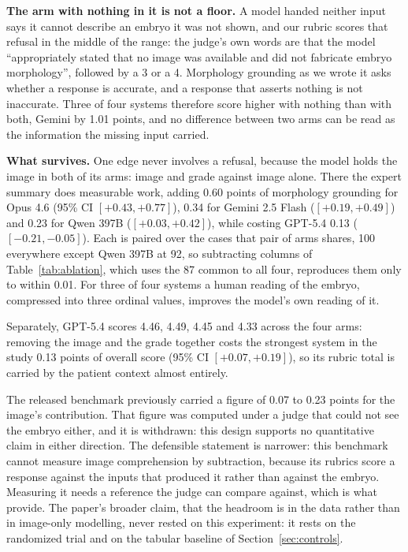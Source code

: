 \documentclass[11pt]{article}
\begin{document}
\textbf{The arm with nothing in it is not a floor.} A model handed neither input
says it cannot describe an embryo it was not shown, and our rubric scores that
refusal in the middle of the range: the judge's own words are that the model
``appropriately stated that no image was available and did not fabricate embryo
morphology'', followed by a 3 or a 4. Morphology grounding as we wrote it asks
whether a response is accurate, and a response that asserts nothing is not
inaccurate. Three of four systems therefore score higher with nothing than with
both, Gemini by 1.01 points, and no difference between two arms can be read as
the information the missing input carried.

\textbf{What survives.} One edge never involves a refusal, because the model
holds the image in both of its arms: image and grade against image alone. There
the expert summary does measurable work, adding 0.60 points of morphology
grounding for Opus 4.6 (95\% CI $[+0.43, +0.77]$), 0.34 for Gemini 2.5 Flash
($[+0.19, +0.49]$) and 0.23 for Qwen 397B ($[+0.03, +0.42]$), while costing
GPT-5.4 0.13 ($[-0.21, -0.05]$). Each is paired over the cases that pair of arms
shares, 100 everywhere except Qwen 397B at 92, so subtracting columns of
Table~\ref{tab:ablation}, which uses the 87 common to all four, reproduces them
only to within 0.01. For three of four systems a human reading of the embryo,
compressed into three ordinal values, improves the model's own reading of it.

Separately, GPT-5.4 scores 4.46, 4.49, 4.45 and 4.33 across the four arms:
removing the image and the grade together costs the strongest system in the study
0.13 points of overall score (95\% CI $[+0.07, +0.19]$), so its rubric total is
carried by the patient context almost entirely.

The released benchmark previously carried a figure of 0.07 to 0.23 points for
the image's contribution. That figure was computed under a judge that could not
see the embryo either, and it is withdrawn: this design supports no quantitative
claim in either direction. The defensible statement is narrower: this benchmark
cannot measure image comprehension by subtraction, because its rubrics score a
response against the inputs that produced it rather than against the embryo.
Measuring it needs a reference the judge can compare against, which is what
\citet{neu2026dataset} provide. The paper's broader claim, that the headroom is
in the data rather than in image-only modelling, never rested on this experiment:
it rests on the randomized trial \citep{illingworth2024} and on the tabular
baseline of Section~\ref{sec:controls}.
\end{document}
